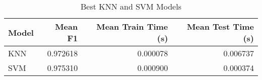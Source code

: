 \begin{table}
\centering
\caption{Best KNN and SVM Models}
\label{tab:best_knn_and_svm_summary_hepatitis}
\begin{tabular}{lrrr}
\toprule
Model & Mean F1 & Mean Train Time (s) & Mean Test Time (s) \\
\midrule
KNN & 0.972618 & 0.000078 & 0.006737 \\
SVM & 0.975310 & 0.000900 & 0.000374 \\
\bottomrule
\end{tabular}
\end{table}
